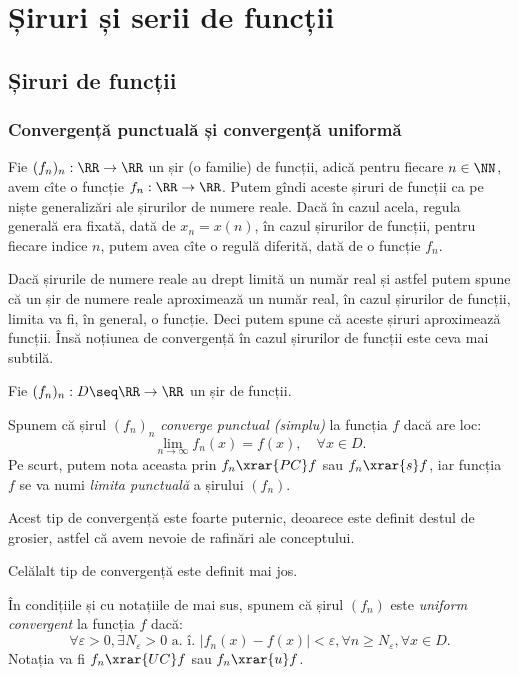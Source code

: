 
\chapter{Șiruri și serii de funcții}

\section{Șiruri de funcții}

\subsection{Convergență punctuală și convergență uniformă}

Fie $ (f_n)_n : \RR \to \RR $ un șir (o familie) de funcții, adică
pentru fiecare $ n \in \NN $, avem cîte o funcție $ f_n : \RR \to \RR $.
Putem gîndi aceste șiruri de funcții ca pe niște generalizări ale
șirurilor de numere reale. Dacă în cazul acela, regula generală era fixată,
dată de $ x_n = x(n) $, în cazul șirurilor de funcții, pentru fiecare indice
$ n $, putem avea cîte o regulă diferită, dată de o funcție $ f_n $.

Dacă șirurile de numere reale au drept limită un număr real și astfel
putem spune că un șir de numere reale aproximează un număr real, în cazul
șirurilor de funcții, limita va fi, în general, o funcție. Deci putem spune
că aceste șiruri aproximează funcții. Însă noțiunea de convergență în cazul
șirurilor de funcții este ceva mai subtilă.

\begin{definition}\label{def:conv-simpl}
  Fie $ (f_n)_n : D \seq \RR \to \RR $ un șir de funcții.

  Spunem că șirul $ (f_n)_n $ \emph{converge punctual (simplu)} la
  funcția $ f $ dacă are loc:
  \[
    \lim_{n \to \infty} f_n(x) = f(x), \quad \forall x \in D.
  \]
  Pe scurt, putem nota aceasta prin $ f_n \xrar{PC} f $ sau $ f_n \xrar{s} f $,
  iar funcția $ f $ se va numi \emph{limita punctuală} a șirului $ (f_n) $.
\end{definition}

Acest tip de convergență este foarte puternic, deoarece este definit destul
de grosier, astfel că avem nevoie de rafinări ale conceptului.

Celălalt tip de convergență este definit mai jos.

\begin{definition}\label{def:conv-unif}
  În condițiile și cu notațiile de mai sus, spunem că șirul $ (f_n) $ este
  \emph{uniform convergent} la funcția $ f $ dacă:
  \[
    \forall \varepsilon > 0, \exists N_\varepsilon > 0 \text{ a. î. } %
    |f_n(x) - f(x)| < \varepsilon, \forall n \geq N_\varepsilon, \forall x \in D.
  \]
  Notația va fi $ f_n \xrar{UC} f $ sau $ f_n \xrar{u} f $.
\end{definition}

